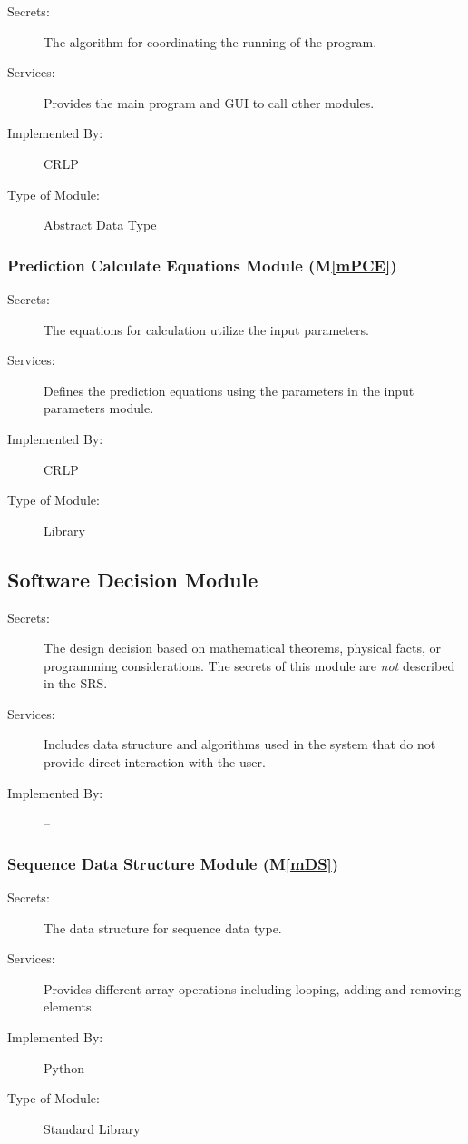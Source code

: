 \documentclass[12pt, titlepage]{article}
\newcommand{\mref}[1]{M\ref{#1}}
\begin{document}
\begin{description}
\begin{description}
    \item[Secrets:] The algorithm for coordinating the running of the program.
    \item[Services:] Provides the main program and GUI to call other modules.
    \item[Implemented By:] CRLP
    \item [Type of Module:] Abstract Data Type
\end{description}

\subsubsection{Prediction Calculate Equations Module (\mref{mPCE})}

\begin{description}
    \item[Secrets:] The equations for calculation utilize the input parameters.
    \item[Services:] Defines the prediction equations using the parameters in the input parameters module.
    \item[Implemented By:] CRLP
    \item [Type of Module:] Library
\end{description}

\subsection{Software Decision Module}

\begin{description}
    \item[Secrets:] The design decision based on mathematical theorems, physical facts, or programming considerations. The secrets of this module are \emph{not} described in the SRS.
    \item[Services:] Includes data structure and algorithms used in the system that do not provide direct interaction with the user. 

\item[Implemented By:] --
\end{description}

\subsubsection{Sequence Data Structure Module (\mref{mDS})}

\begin{description}
    \item[Secrets:] The data structure for sequence data type.
    \item[Services:] Provides different array operations including looping, adding and removing elements.
    \item[Implemented By:] Python
    \item [Type of Module:] Standard Library
\end{description}


\end{description}
\end{document}
